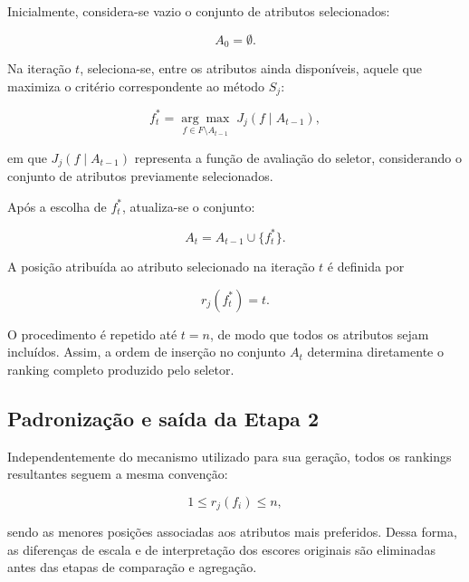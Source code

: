 Inicialmente, considera-se vazio o conjunto de atributos selecionados:

\begin{equation}
    A_0=\emptyset.
\end{equation}

Na iteração $t$, seleciona-se, entre os atributos ainda disponíveis, aquele
que maximiza o critério correspondente ao método $S_j$:

\begin{equation}
    f_t^{*}
    =
    \underset{f\in F\setminus A_{t-1}}
    {\arg\max}
    \;
    J_j(f\mid A_{t-1}),
    \label{eq:selecao-sequencial-ac-efs}
\end{equation}

em que $J_j(f\mid A_{t-1})$ representa a função de avaliação do seletor,
considerando o conjunto de atributos previamente selecionados.

Após a escolha de $f_t^{*}$, atualiza-se o conjunto:

\begin{equation}
    A_t=A_{t-1}\cup\{f_t^{*}\}.
    \label{eq:atualizacao-conjunto-ac-efs}
\end{equation}

A posição atribuída ao atributo selecionado na iteração $t$ é definida por

\begin{equation}
    r_j(f_t^{*})=t.
    \label{eq:rank-sequencial-ac-efs}
\end{equation}

O procedimento é repetido até $t=n$, de modo que todos os atributos sejam
incluídos. Assim, a ordem de inserção no conjunto $A_t$ determina diretamente
o ranking completo produzido pelo seletor.


\subsection{Padronização e saída da Etapa 2}
\label{subsec:ac-efs-saida-etapa2}

Independentemente do mecanismo utilizado para sua geração, todos os rankings
resultantes seguem a mesma convenção:

\begin{equation}
    1 \leq r_j(f_i) \leq n,
\end{equation}

sendo as menores posições associadas aos atributos mais preferidos. Dessa
forma, as diferenças de escala e de interpretação dos escores originais são
eliminadas antes das etapas de comparação e agregação.

